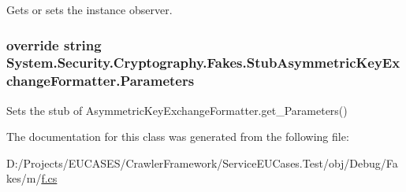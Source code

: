 Gets or sets the instance observer.

\hypertarget{class_system_1_1_security_1_1_cryptography_1_1_fakes_1_1_stub_asymmetric_key_exchange_formatter_a0b9ba9e4226fd319cbdad8a4788225a2}{
\subsubsection[{Parameters}]{\setlength{\rightskip}{0pt plus 5cm}override string System.\-Security.\-Cryptography.\-Fakes.\-Stub\-Asymmetric\-Key\-Exchange\-Formatter.\-Parameters\hspace{0.3cm}{\ttfamily [get]}}}\label{class_system_1_1_security_1_1_cryptography_1_1_fakes_1_1_stub_asymmetric_key_exchange_formatter_a0b9ba9e4226fd319cbdad8a4788225a2}


Sets the stub of Asymmetric\-Key\-Exchange\-Formatter.\-get\-\_\-\-Parameters()



The documentation for this class was generated from the following file\-:\begin{DoxyCompactItemize}
\item 
D\-:/\-Projects/\-E\-U\-C\-A\-S\-E\-S/\-Crawler\-Framework/\-Service\-E\-U\-Cases.\-Test/obj/\-Debug/\-Fakes/m/\hyperlink{m_2f_8cs}{f.\-cs}\end{DoxyCompactItemize}
